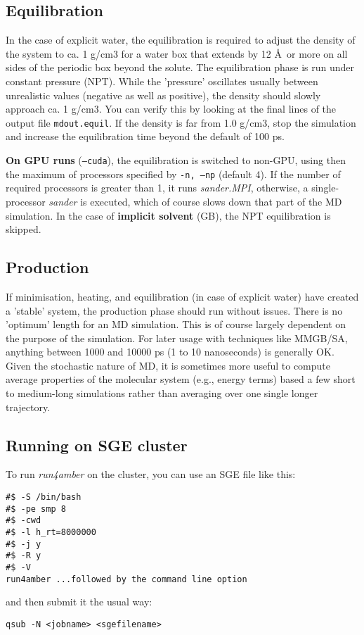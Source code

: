 \documentclass[10pt,landscape,twocolumn]{article}
\begin{document}
\subsection{Equilibration}
In the case of explicit water, the equilibration is required to adjust the density of the system to ca. 1 g/cm3 for a water box that extends by 12 \AA \ or more on all sides of the periodic box beyond the solute. The equilibration phase is run under constant pressure (NPT). While the 'pressure' oscillates usually between unrealistic values (negative as well as positive), the density should slowly approach ca. 1 g/cm3. You can verify this by looking at the final lines of the output file \texttt{mdout.equil}. If the density is far from 1.0 g/cm3, stop the simulation and increase the equilibration time beyond the default of 100 ps.

\textbf{On GPU runs} (\texttt{--cuda}), the equilibration is switched to non-GPU, using then the maximum of processors specified by \texttt{-n, --np} (default 4). If the number of required processors is greater than 1, it runs \textsl{sander.MPI}, otherwise, a single-processor \textsl{sander} is executed, which of course slows down that part of the MD simulation. In the case of \textbf{implicit solvent} (GB), the NPT equilibration is skipped.

\subsection{Production}
If minimisation, heating, and equilibration (in case of explicit water) have created a 'stable' system, the production phase should run without issues. There is no 'optimum' length for an MD simulation. This is of course largely dependent on the purpose of the simulation. For later usage with techniques like MMGB/SA, anything between 1000 and 10000 ps (1 to 10 nanoseconds) is generally OK. Given the stochastic nature of MD, it is sometimes more useful to compute average properties of the molecular system (e.g., energy terms) based a few short to medium-long simulations rather than averaging over one single longer trajectory. 


\subsection{Running on SGE cluster}
To run \textsl{run4amber} on the cluster, you can use an SGE file like this:
\begin{verbatim}
#$ -S /bin/bash
#$ -pe smp 8
#$ -cwd
#$ -l h_rt=8000000
#$ -j y
#$ -R y
#$ -V
run4amber ...followed by the command line option
\end{verbatim}
and then submit it the usual way:

\texttt{qsub -N <jobname> <sgefilename>}

\end{document}

